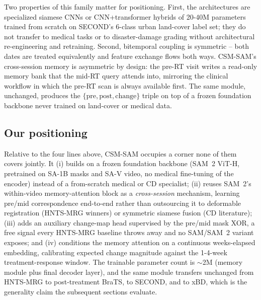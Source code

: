 Two properties of this family matter for positioning. First, the
architectures are specialized siamese CNNs or CNN+transformer hybrids
of 20-40M parameters trained from scratch on SECOND's 6-class urban
land-cover label set; they do not transfer to medical tasks or to
disaster-damage grading without architectural re-engineering and
retraining. Second, bitemporal coupling is symmetric -- both dates
are treated equivalently and feature exchange flows both ways.
CSM-SAM's cross-session memory is asymmetric by design: the pre-RT
visit writes a read-only memory bank that the mid-RT query attends
into, mirroring the clinical workflow in which the pre-RT scan is
always available first. The same module, unchanged, produces the
$\{\text{pre}, \text{post}, \text{change}\}$ triple on top of a frozen
foundation backbone never trained on land-cover or medical data.

\subsection{Our positioning}
\label{sec:related:positioning}

Relative to the four lines above, CSM-SAM occupies a corner none of
them covers jointly. It (i) builds on a frozen foundation backbone
(SAM~2 ViT-H, pretrained on SA-1B masks and SA-V video, no medical
fine-tuning of the encoder) instead of a from-scratch medical or CD
specialist; (ii) reuses SAM~2's within-video memory-attention block
as a \emph{cross-session} mechanism, learning pre/mid correspondence
end-to-end rather than outsourcing it to deformable registration
(HNTS-MRG winners) or symmetric siamese fusion (CD literature);
(iii) adds an auxiliary change-map head supervised by the pre/mid
mask XOR, a free signal every HNTS-MRG baseline throws away and no
SAM/SAM~2 variant exposes; and (iv) conditions the memory attention
on a continuous weeks-elapsed embedding, calibrating expected change
magnitude against the 1-4-week treatment-response window. The
trainable parameter count is $\sim$2M (memory module plus final
decoder layer), and the same module transfers unchanged from
HNTS-MRG to post-treatment BraTS, to SECOND, and to xBD, which is
the generality claim the subsequent sections evaluate.

